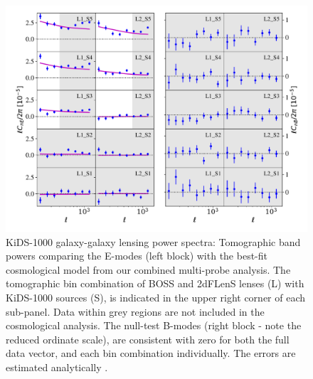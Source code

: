 \begin{figure}
        \includegraphics[width=\textwidth]{Data_Plots/Pgk/Pgk_K1000_2Dbins_v2_goldclasses_Flag_SOM_Fid_A.pdf}
        \caption{KiDS-1000 galaxy-galaxy lensing power spectra:
          Tomographic band powers comparing the E-modes (left block)
          with the best-fit
          cosmological model from our combined multi-probe analysis.  The tomographic 
        bin combination of BOSS and 2dFLenS lenses (L) with KiDS-1000
        sources (S), is indicated in the upper right corner of each
        sub-panel.  Data within grey regions are not included in the cosmological analysis.
        The null-test B-modes (right block - note the reduced ordinate scale), are
      consistent with zero for both the full data vector, and each
     bin combination individually.  The errors are estimated analytically \citep{joachimi/etal:inprep}. }
        \label{fig:Pgk}
\end{figure}



